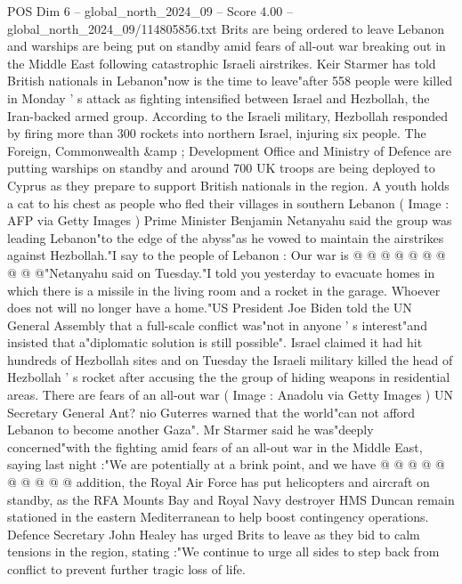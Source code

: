 \begin{textsample}{POS Dim 6 – global\_north\_2024\_09 – Score 4.00 – global\_north\_2024\_09/114805856.txt}  \label{ex:f6_pos_429}
Brits are being ordered to leave Lebanon and warships are being put on standby amid fears of all-out war breaking out in the Middle East following catastrophic Israeli airstrikes.
Keir Starmer has told British nationals in Lebanon"now is the time to leave"after 558 people were killed in Monday ' s attack as fighting intensified between Israel and Hezbollah, the Iran-backed armed group.
According to the Israeli military, Hezbollah responded by firing more than 300 rockets into northern Israel, injuring six people.
The Foreign, Commonwealth \&amp ; Development Office and Ministry of Defence are putting warships on standby and around 700 UK troops are being deployed to Cyprus as they prepare to support British nationals in the region.
A youth holds a cat to his chest as people who fled their villages in southern Lebanon ( Image : AFP via Getty Images ) Prime Minister Benjamin Netanyahu said the group was leading Lebanon"to the edge of the abyss"as he vowed to maintain the airstrikes against Hezbollah."I say to the people of Lebanon : Our war is @ @ @ @ @ @ @ @ @ @"Netanyahu said on Tuesday."I told you yesterday to evacuate homes in which there is a missile in the living room and a rocket in the garage.
Whoever does not will no longer have a home."US President Joe Biden told the UN General Assembly that a full-scale conflict was"not in anyone ' s interest"and insisted that a"diplomatic solution is still possible".
Israel claimed it had hit hundreds of Hezbollah sites and on Tuesday the Israeli military killed the head of Hezbollah ' s rocket after accusing the the group of hiding weapons in residential areas.
There are fears of an all-out war ( Image : Anadolu via Getty Images ) UN Secretary General Ant? nio Guterres warned that the world"can not afford Lebanon to become another Gaza".
Mr Starmer said he was"deeply concerned"with the fighting amid fears of an all-out war in the Middle East, saying last night :"We are potentially at a brink point, and we have @ @ @ @ @ @ @ @ @ @ addition, the Royal Air Force has put helicopters and aircraft on standby, as the RFA Mounts Bay and Royal Navy destroyer HMS Duncan remain stationed in the eastern Mediterranean to help boost contingency operations.
Defence Secretary John Healey has urged Brits to leave as they bid to calm tensions in the region, stating :"We continue to urge all sides to step back from conflict to prevent further tragic loss of life.

\end{textsample}

